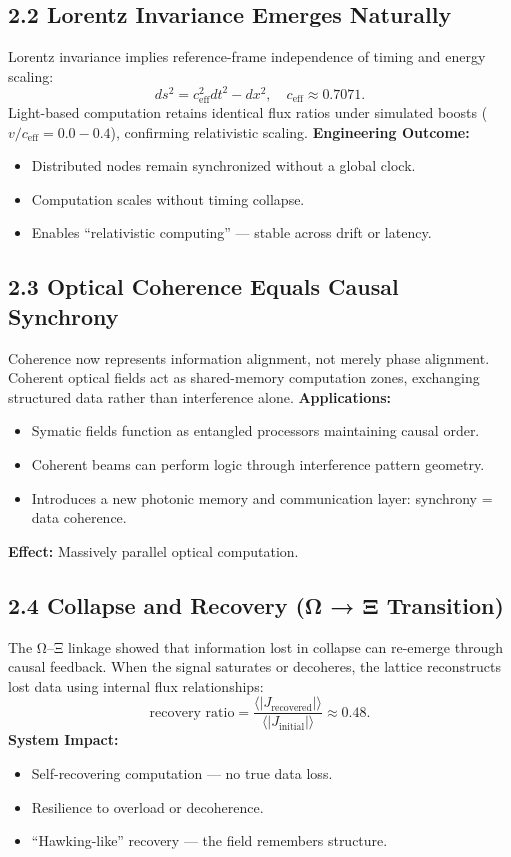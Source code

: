 \documentclass[11pt,a4paper]{article}
\begin{document}
\subsection*{2.2 Lorentz Invariance Emerges Naturally}
Lorentz invariance implies reference-frame independence of timing and energy scaling:
\[
ds^2 = c_{\mathrm{eff}}^2 dt^2 - dx^2,\quad c_{\mathrm{eff}}\approx0.7071.
\]
Light-based computation retains identical flux ratios under simulated boosts (\(v/c_{\mathrm{eff}}=0.0{-}0.4\)), confirming relativistic scaling.  
\textbf{Engineering Outcome:}
\begin{itemize}
  \item Distributed nodes remain synchronized without a global clock.
  \item Computation scales without timing collapse.
  \item Enables “relativistic computing” --- stable across drift or latency.
\end{itemize}

\subsection*{2.3 Optical Coherence Equals Causal Synchrony}
Coherence now represents information alignment, not merely phase alignment.  
Coherent optical fields act as shared-memory computation zones, exchanging structured data rather than interference alone.  
\textbf{Applications:}
\begin{itemize}
  \item Symatic fields function as entangled processors maintaining causal order.
  \item Coherent beams can perform logic through interference pattern geometry.
  \item Introduces a new photonic memory and communication layer: synchrony = data coherence.
\end{itemize}
\textbf{Effect:} Massively parallel optical computation.

\subsection*{2.4 Collapse and Recovery (Ω → Ξ Transition)}
The Ω--Ξ linkage showed that information lost in collapse can re-emerge through causal feedback.  
When the signal saturates or decoheres, the lattice reconstructs lost data using internal flux relationships:
\[
\text{recovery ratio} = \frac{\langle|J_{\mathrm{recovered}}|\rangle}{\langle|J_{\mathrm{initial}}|\rangle} \approx 0.48.
\]
\textbf{System Impact:}
\begin{itemize}
  \item Self-recovering computation --- no true data loss.
  \item Resilience to overload or decoherence.
  \item “Hawking-like” recovery --- the field remembers structure.
\end{itemize}
\end{document}
